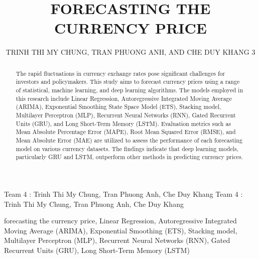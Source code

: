 \documentclass{ieeeojies}
\begin{document}
\title{FORECASTING THE CURRENCY PRICE}

\author{\uppercase{Trinh Thi My Chung},
\uppercase{Tran Phuong Anh, and Che Duy Khang 3}}

\address[1]{Faculty of Information Systems, University of Information Technology, (e-mail: 21520653@gm.uit.edu.vn)}
\address[2]{Faculty of Information Systems, University of Information Technology, (e-mail: 21520595@gm.uit.edu.vn)}
\address[3]{Faculty of Information Systems, University of Information Technology, (e-mail: 21522187@gm.uit.edu.vn)}

\markboth
{Team 4 \headeretal: Trinh Thi My Chung, Tran Phuong Anh, Che Duy Khang}
{Team 4 \headeretal: Trinh Thi My Chung, Tran Phuong Anh, Che Duy Khang}

\begin{abstract}

The rapid fluctuations in currency exchange rates pose significant challenges for investors and policymakers. This study aims to forecast currency prices using a range of statistical, machine learning, and deep learning algorithms. The models employed in this research include Linear Regression, Autoregressive Integrated Moving Average (ARIMA), Exponential Smoothing State Space Model (ETS), Stacking model, Multilayer Perceptron (MLP), Recurrent Neural Networks (RNN), Gated Recurrent Units (GRU), and Long Short-Term Memory (LSTM). Evaluation metrics such as Mean Absolute Percentage Error (MAPE), Root Mean Squared Error (RMSE), and Mean Absolute Error (MAE) are utilized to assess the performance of each forecasting model on various currency datasets. The findings indicate that deep learning models, particularly GRU and LSTM, outperform other methods in predicting currency prices.
\end{abstract}

\begin{keywords}

forecasting the currency price, Linear Regression, Autoregressive Integrated Moving Average (ARIMA), Exponential Smoothing (ETS), Stacking model, Multilayer Perceptron (MLP), Recurrent Neural Networks (RNN), Gated Recurrent Units (GRU), Long Short-Term Memory (LSTM)
\end{keywords}

\titlepgskip=-15pt

\maketitle
\end{document}
